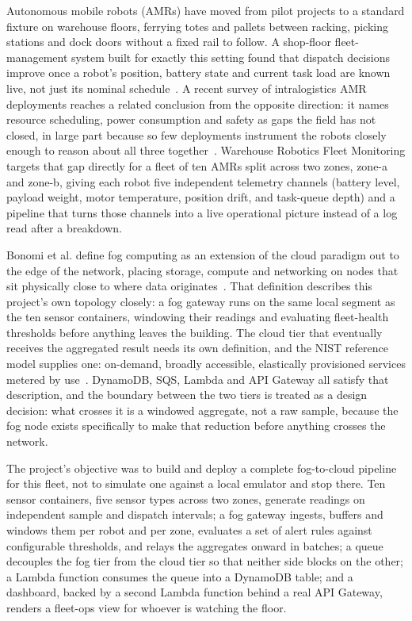 \documentclass[conference]{IEEEtran}
\begin{document}
Autonomous mobile robots (AMRs) have moved from pilot projects to a standard fixture on warehouse floors, ferrying totes and pallets between racking, picking stations and dock doors without a fixed rail to follow. A shop-floor fleet-management system built for exactly this setting found that dispatch decisions improve once a robot's position, battery state and current task load are known live, not just its nominal schedule~\cite{ref1}. A recent survey of intralogistics AMR deployments reaches a related conclusion from the opposite direction: it names resource scheduling, power consumption and safety as gaps the field has not closed, in large part because so few deployments instrument the robots closely enough to reason about all three together~\cite{ref2}. Warehouse Robotics Fleet Monitoring targets that gap directly for a fleet of ten AMRs split across two zones, zone-a and zone-b, giving each robot five independent telemetry channels (battery level, payload weight, motor temperature, position drift, and task-queue depth) and a pipeline that turns those channels into a live operational picture instead of a log read after a breakdown.

Bonomi et al. define fog computing as an extension of the cloud paradigm out to the edge of the network, placing storage, compute and networking on nodes that sit physically close to where data originates~\cite{ref3}. That definition describes this project's own topology closely: a fog gateway runs on the same local segment as the ten sensor containers, windowing their readings and evaluating fleet-health thresholds before anything leaves the building. The cloud tier that eventually receives the aggregated result needs its own definition, and the NIST reference model supplies one: on-demand, broadly accessible, elastically provisioned services metered by use~\cite{ref4}. DynamoDB, SQS, Lambda and API Gateway all satisfy that description, and the boundary between the two tiers is treated as a design decision: what crosses it is a windowed aggregate, not a raw sample, because the fog node exists specifically to make that reduction before anything crosses the network.

The project's objective was to build and deploy a complete fog-to-cloud pipeline for this fleet, not to simulate one against a local emulator and stop there. Ten sensor containers, five sensor types across two zones, generate readings on independent sample and dispatch intervals; a fog gateway ingests, buffers and windows them per robot and per zone, evaluates a set of alert rules against configurable thresholds, and relays the aggregates onward in batches; a queue decouples the fog tier from the cloud tier so that neither side blocks on the other; a Lambda function consumes the queue into a DynamoDB table; and a dashboard, backed by a second Lambda function behind a real API Gateway, renders a fleet-ops view for whoever is watching the floor.
\end{document}
